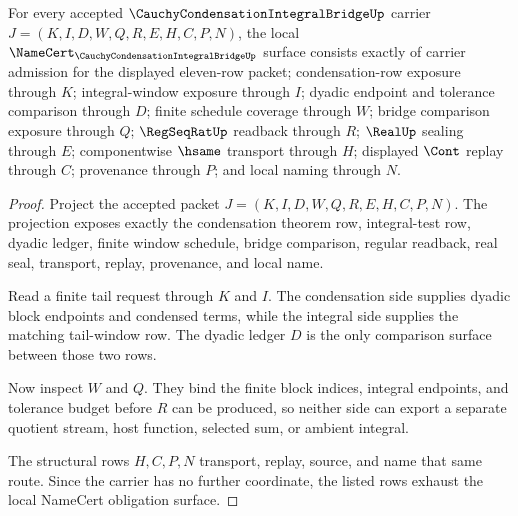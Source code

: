 \begin{theorem}
\label{thm:cauchy-condensation-integral-bridge-namecert-obligations}
For every accepted $\CauchyCondensationIntegralBridgeUp$ carrier $J=(K,I,D,W,Q,R,E,H,C,P,N)$, the local $\NameCert_{\CauchyCondensationIntegralBridgeUp}$ surface consists exactly of carrier admission for the displayed eleven-row packet; condensation-row exposure through $K$; integral-window exposure through $I$; dyadic endpoint and tolerance comparison through $D$; finite schedule coverage through $W$; bridge comparison exposure through $Q$; $\RegSeqRatUp$ readback through $R$; $\RealUp$ sealing through $E$; componentwise $\hsame$ transport through $H$; displayed $\Cont$ replay through $C$; provenance through $P$; and local naming through $N$.
\end{theorem}
\begin{proof}
Project the accepted packet $J=(K,I,D,W,Q,R,E,H,C,P,N)$. The projection exposes exactly the condensation theorem row, integral-test row, dyadic ledger, finite window schedule, bridge comparison, regular readback, real seal, transport, replay, provenance, and local name.

Read a finite tail request through $K$ and $I$. The condensation side supplies dyadic block endpoints and condensed terms, while the integral side supplies the matching tail-window row. The dyadic ledger $D$ is the only comparison surface between those two rows.

Now inspect $W$ and $Q$. They bind the finite block indices, integral endpoints, and tolerance budget before $R$ can be produced, so neither side can export a separate quotient stream, host function, selected sum, or ambient integral.

The structural rows $H,C,P,N$ transport, replay, source, and name that same route. Since the carrier has no further coordinate, the listed rows exhaust the local NameCert obligation surface.
\end{proof}

